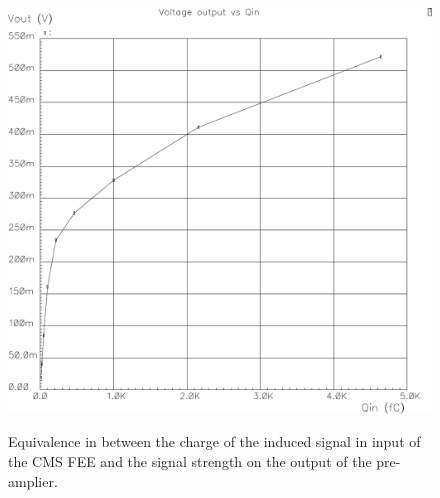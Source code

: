 	\begin{figure}[H]
		\centering
		\includegraphics[width = 0.7\plotwidth]{fig/chapt4/CMS-FEE-preamp.pdf}\\
		\caption{\label{fig:CMS-FEE-preamp} Equivalence in between the charge of the induced signal in input of the CMS FEE and the signal strength on the output of the pre-amplier.}
	\end{figure}
	
